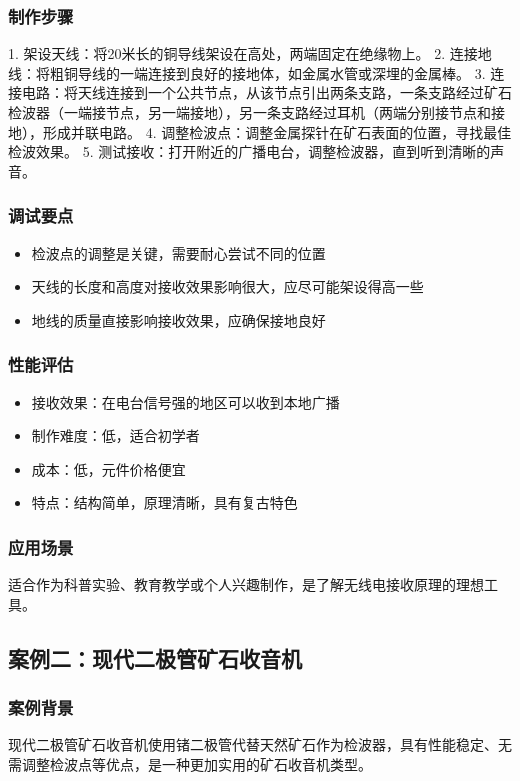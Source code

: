\documentclass[12pt,UTF8]{ctexbook}
\begin{document}
\subsubsection{制作步骤}
1. 架设天线：将20米长的铜导线架设在高处，两端固定在绝缘物上。
2. 连接地线：将粗铜导线的一端连接到良好的接地体，如金属水管或深埋的金属棒。
3. 连接电路：将天线连接到一个公共节点，从该节点引出两条支路，一条支路经过矿石检波器（一端接节点，另一端接地），另一条支路经过耳机（两端分别接节点和接地），形成并联电路。
4. 调整检波点：调整金属探针在矿石表面的位置，寻找最佳检波效果。
5. 测试接收：打开附近的广播电台，调整检波器，直到听到清晰的声音。

\subsubsection{调试要点}
\begin{itemize}
  \item 检波点的调整是关键，需要耐心尝试不同的位置
  \item 天线的长度和高度对接收效果影响很大，应尽可能架设得高一些
  \item 地线的质量直接影响接收效果，应确保接地良好
\end{itemize}

\subsubsection{性能评估}
\begin{itemize}
  \item 接收效果：在电台信号强的地区可以收到本地广播
  \item 制作难度：低，适合初学者
  \item 成本：低，元件价格便宜
  \item 特点：结构简单，原理清晰，具有复古特色
\end{itemize}

\subsubsection{应用场景}
适合作为科普实验、教育教学或个人兴趣制作，是了解无线电接收原理的理想工具。

\subsection{案例二：现代二极管矿石收音机}

\subsubsection{案例背景}
现代二极管矿石收音机使用锗二极管代替天然矿石作为检波器，具有性能稳定、无需调整检波点等优点，是一种更加实用的矿石收音机类型。
\end{document}
